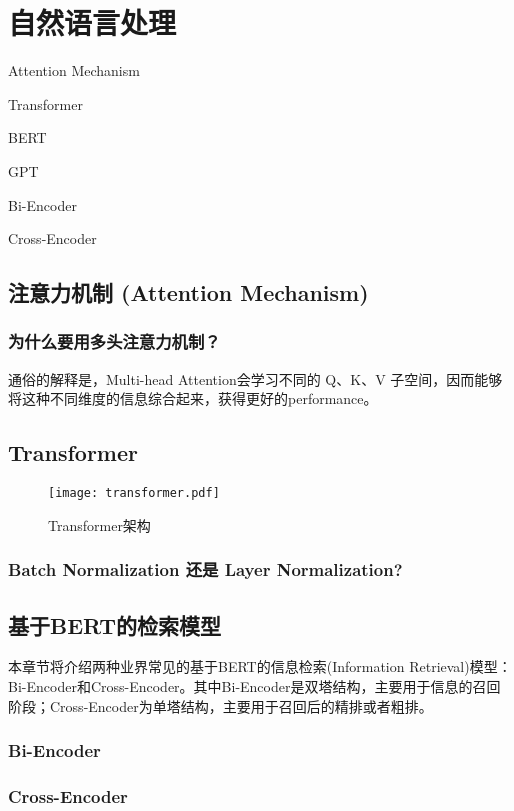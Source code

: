 \chapter{自然语言处理}
\begin{introduction}
  \item Attention Mechanism
  \item Transformer
  \item BERT
  \item GPT
  \item Bi-Encoder
  \item Cross-Encoder
\end{introduction}

\section{注意力机制 (Attention Mechanism)}


\subsection{为什么要用多头注意力机制？}

通俗的解释是，Multi-head Attention会学习不同的 Q、K、V 子空间，因而能够将这种不同维度的信息综合起来，获得更好的performance。

\section{Transformer}

\begin{figure}[htbp]
  \centering
  \texttt{[image: transformer.pdf]}
  \caption{Transformer架构 \label{fig:transformer}}
\end{figure}


\subsection{Batch Normalization 还是 Layer Normalization?}

\section{基于BERT的检索模型}

本章节将介绍两种业界常见的基于BERT的信息检索(Information Retrieval)模型：Bi-Encoder和Cross-Encoder。其中Bi-Encoder是双塔结构，主要用于信息的召回阶段；Cross-Encoder为单塔结构，主要用于召回后的精排或者粗排。

\subsection{Bi-Encoder}

\subsection{Cross-Encoder}
